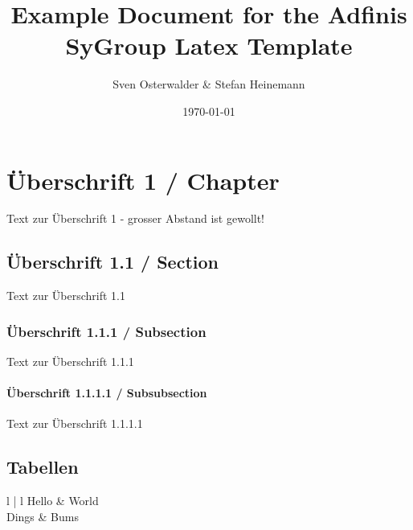 \documentclass[oneside]{report}
\title{Example Document for the Adfinis SyGroup Latex Template}
\author{Sven Osterwalder \& Stefan Heinemann}
\date{\today}
\begin{document}
\maketitle{}
%

\tableofcontents{}

\chapter{Überschrift 1 / Chapter}

Text zur Überschrift 1 - grosser Abstand ist gewollt!

\section{Überschrift 1.1 / Section}

Text zur Überschrift 1.1

\subsection{Überschrift 1.1.1 / Subsection}

Text zur Überschrift 1.1.1

\subsubsection{Überschrift 1.1.1.1 / Subsubsection}

Text zur Überschrift 1.1.1.1


\section{Tabellen}

\begin{tabulary}{l  | l}
	Hello & World \\
	Dings & Bums \\
\end{tabulary}
\end{document}
